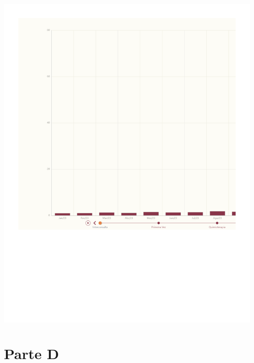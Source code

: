 \documentclass[
  letterpaper,
  DIV=11,
  numbers=noendperiod]{scrreprt}
\begin{document}
\includegraphics{2023_files/figure-pdf/unnamed-chunk-8-1.pdf}

\section{Parte D}
\end{document}
